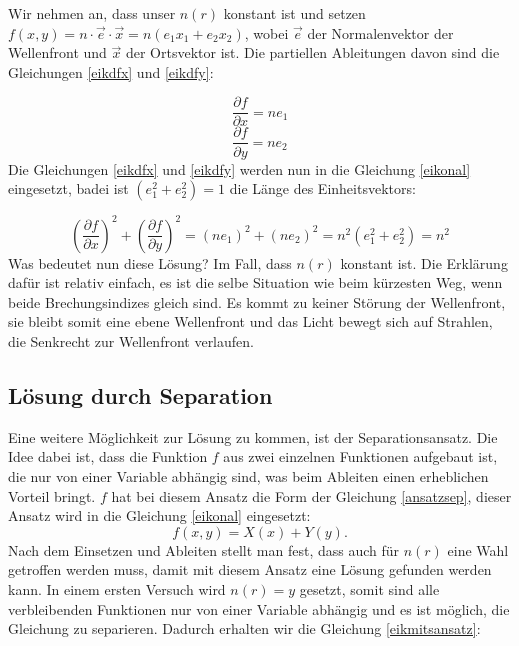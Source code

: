 \begin{refsection}
Wir nehmen an, dass
unser $n(r)$ konstant ist und setzen $f(x,y)=n\cdot\vec{e}\cdot\vec{x}=
n(e_{1}x_{1}+e_{2}x_{2})$, wobei $\vec{e}$ der Normalenvektor der
Wellenfront und $\vec{x}$ der Ortsvektor ist. Die partiellen Ableitungen
davon sind die Gleichungen \eqref{eikdfx} und \eqref{eikdfy}:

\begin{equation}\label{eikdfx}
\dfrac{\partial f}{\partial x} = ne_{1}
\end{equation}
\begin{equation}\label{eikdfy}
\dfrac{\partial f}{\partial y} = ne_{2}
\end{equation}
Die Gleichungen \eqref{eikdfx} und \eqref{eikdfy} werden nun in die Gleichung \eqref{eikonal} eingesetzt, badei ist $(e_{1}^{2}+e_{2}^{2})=1$ die Länge des Einheitsvektors:

\begin{equation}\label{lösung_eik}
\left( \dfrac{\partial f}{\partial x}\right)^{2} + \left( \dfrac{\partial f}{\partial y}\right) ^{2} = \left( ne_{1}\right) ^{2}+\left( ne_{2}\right)^{2}=n^{2}(e_{1}^{2}+e_{2}^{2})=n^{2}
\end{equation}
Was bedeutet nun diese Lösung? Im Fall, dass $n(r)$ konstant ist. Die Erklärung dafür ist relativ einfach, es ist die selbe Situation wie beim kürzesten Weg, wenn beide Brechungsindizes gleich sind. Es kommt zu keiner Störung der Wellenfront, sie bleibt somit eine ebene Wellenfront und das Licht bewegt sich auf Strahlen, die Senkrecht zur Wellenfront verlaufen.

\subsection{Lösung durch Separation}
%
%
Eine weitere Möglichkeit zur Lösung zu kommen, ist der
Separationsansatz. Die Idee dabei ist, dass die Funktion $f$ aus zwei
einzelnen Funktionen aufgebaut ist, die nur von einer Variable abhängig
sind, was beim Ableiten einen erheblichen Vorteil bringt. $f$ hat bei
diesem Ansatz die Form der Gleichung \eqref{ansatzsep}, dieser Ansatz
wird in die Gleichung \eqref{eikonal} eingesetzt:
\begin{equation}\label{ansatzsep}
f(x,y)=X(x) + Y(y).
\end{equation}
Nach dem Einsetzen und Ableiten stellt man fest, dass auch für $n(r)$ eine Wahl getroffen werden muss, damit mit diesem Ansatz eine Lösung gefunden werden kann. In einem ersten Versuch wird $n(r)=y$ gesetzt, somit sind alle verbleibenden Funktionen nur von einer Variable abhängig und es ist möglich, die Gleichung zu separieren. Dadurch erhalten wir die Gleichung \eqref{eikmitsansatz}:


\end{refsection}
